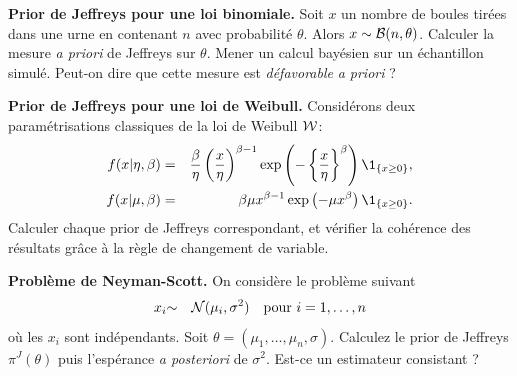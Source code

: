 \documentclass[10pt]{article}
\begin{document}
\if{} \vspace{1cm} 
\begin{exec}{\bf Prior de Jeffreys pour une loi binomiale.}\label{exobino}
Soit $x$ un nombre de boules tirées dans une urne en contenant $n$ avec probabilité $\theta$. Alors $x\sim {\cal{B}}(n,\theta)$. Calculer la mesure {\it a priori} de Jeffreys sur $\theta$. Mener un calcul bayésien sur un échantillon simulé. Peut-on dire que cette mesure est {\it défavorable} {\it a priori} ? 
\end{exec}


\fi

\if{} \vspace{1cm}
\begin{exec}{\bf Prior de Jeffreys pour une loi de Weibull.}
Considérons deux paramétrisations classiques de la loi de Weibull ${\cal{W}}$:
\begin{eqnarray*}
f(x|\eta,\beta) & = & \frac{\beta}{\eta} \left(\frac{x}{\eta}\right)^{\beta-1} \exp\left(-\left\{\frac{x}{\eta}\right\}^{\beta}\right) \1_{\{x\geq 0\}}, \\
f(x|\mu,\beta) & = & \beta \mu x^{\beta-1} \exp\left(-\mu x^{\beta}\right) \1_{\{x\geq 0\}}. 
\end{eqnarray*}
Calculer chaque prior de Jeffreys correspondant, et vérifier la cohérence des résultats grâce à la règle de changement de variable. 
\end{exec}

 
\fi

\if{} \vspace{1cm}
\begin{exec}{\bf Problème de Neyman-Scott.}\label{neymann.scott}
On considère le problème suivant
\begin{eqnarray*}
x_i & {\sim} & {\cal{N}}(\mu_i,\sigma^2) \ \ \ \text{pour $i=1,\ldots,n$}
\end{eqnarray*}
où les $x_i$ sont indépendants. Soit $\theta=(\mu_1,\ldots,\mu_n,\sigma)$. Calculez le prior de Jeffreys $\pi^J(\theta)$ puis l'espérance {\it a posteriori} de $\sigma^2$. Est-ce un estimateur consistant ?
\end{exec}

 
\fi
\end{document}
